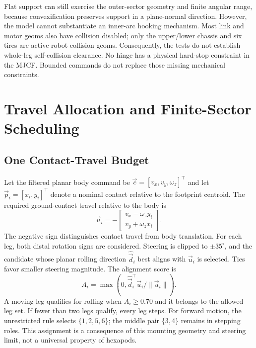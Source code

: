 \documentclass[letterpaper,10pt,conference]{ieeeconf}
\newcommand{\vct}[1]{\vec{#1}}
\begin{document}
Flat support can still exercise the outer-sector geometry and finite angular range, because convexification preserves support in a plane-normal direction. However, the model cannot substantiate an inner-arc hooking mechanism. Most link and motor geoms also have collision disabled; only the upper/lower chassis and six tires are active robot collision geoms. Consequently, the tests do not establish whole-leg self-collision clearance. No hinge has a physical hard-stop constraint in the MJCF. Bounded commands do not replace those missing mechanical constraints.

\section{Travel Allocation and Finite-Sector Scheduling}
\subsection{One Contact-Travel Budget}
Let the filtered planar body command be $\vct{c}=[v_x,v_y,\omega_z]^\top$ and let $\vct{p}_i=[x_i,y_i]^\top$ denote a nominal contact relative to the footprint centroid. The required ground-contact travel relative to the body is
\begin{equation}
 \vct{u}_i=-\begin{bmatrix}v_x-\omega_z y_i\\v_y+\omega_z x_i\end{bmatrix}.\label{eq:travel}
\end{equation}
The negative sign distinguishes contact travel from body translation. For each leg, both distal rotation signs are considered. Steering is clipped to $\pm35^\circ$, and the candidate whose planar rolling direction $\hat{\vct{d}}_i$ best aligns with $\vct{u}_i$ is selected. Ties favor smaller steering magnitude. The alignment score is
\begin{equation}
 A_i=\max\left(0,\hat{\vct{d}}_i^\top\vct{u}_i/\|\vct{u}_i\|\right).
\end{equation}
A moving leg qualifies for rolling when $A_i\ge0.70$ and it belongs to the allowed leg set. If fewer than two legs qualify, every leg steps. For forward motion, the unrestricted rule selects $\{1,2,5,6\}$; the middle pair $\{3,4\}$ remains in stepping roles. This assignment is a consequence of this mounting geometry and steering limit, not a universal property of hexapods.
\end{document}
